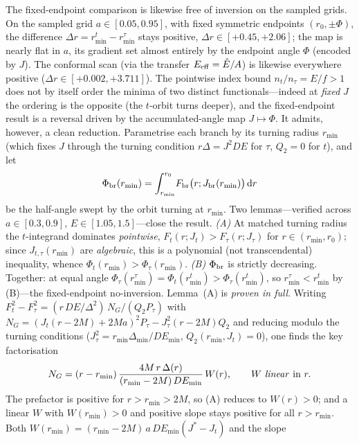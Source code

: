 \documentclass[12pt]{iopart}
\theoremstyle{plain}
\theoremstyle{definition}
\theoremstyle{remark}
\newcommand{\dd}{\mathrm{d}}
\begin{document}
The fixed-endpoint comparison is likewise free of inversion on the sampled grids. On the sampled grid $a\in[0.05,0.95]$, with fixed symmetric
endpoints $(r_0,\pm\Phi)$, the difference $\Delta r=r_{\min}^t-r_{\min}^\tau$ stays positive,
$\Delta r\in[+0.45,+2.06]$; the map is nearly flat
in $a$, its gradient set almost entirely by the endpoint angle
$\Phi$ (encoded by $J$). The conformal scan (via the transfer
$E_{\rm eff}=\hat E/A$) is likewise everywhere positive
($\Delta r\in[+0.002,+3.711]$). The pointwise index bound $n_t/n_\tau=E/f>1$ does
not by itself order the minima of two distinct functionals---indeed at \emph{fixed}
$J$ the ordering is the opposite (the $t$-orbit turns deeper), and the fixed-endpoint
result is a reversal driven by the accumulated-angle map $J\mapsto\Phi$. It admits,
however, a clean reduction. Parametrise each branch by its turning radius $r_{\min}$
(which fixes $J$ through the turning condition $r\Delta=J^2 DE$ for $\tau$, $Q_2=0$
for $t$), and let
\begin{equation}
    \Phi_{\rm br}(r_{\min})=\int_{r_{\min}}^{r_0}\!F_{\rm br}\big(r;J_{\rm br}(r_{\min})\big)\,\dd r
\end{equation}
be the half-angle swept by the orbit turning at $r_{\min}$. Two lemmas---verified
across $a\in[0.3,0.9]$, $E\in[1.05,1.5]$---close the result. \emph{(A)} At matched
turning radius the $t$-integrand dominates \emph{pointwise},
$F_t(r;J_t)>F_\tau(r;J_\tau)$ for $r\in(r_{\min},r_0)$; since $J_{t,\tau}(r_{\min})$
are \emph{algebraic}, this is a polynomial (not transcendental) inequality, whence
$\Phi_t(r_{\min})>\Phi_\tau(r_{\min})$. \emph{(B)} $\Phi_{\rm br}$ is strictly
decreasing. Together: at equal angle
$\Phi_\tau(r_{\min}^\tau)=\Phi_t(r_{\min}^t)>\Phi_\tau(r_{\min}^t)$, so
$r_{\min}^\tau<r_{\min}^t$ by (B)---the fixed-endpoint no-inversion. Lemma~(A) is
\emph{proven in full}. Writing $F_t^2-F_\tau^2=(r\,DE/\Delta^2)\,N_G/(Q_2 P_\tau)$
with $N_G=(J_t(r-2M)+2Ma)^2 P_\tau-J_\tau^2(r-2M)Q_2$ and reducing modulo the turning
conditions ($J_\tau^2=r_{\min}\Delta_{\min}/DE_{\min}$, $Q_2(r_{\min},J_t)=0$), one
finds the key factorisation
\begin{equation}
    N_G=(r-r_{\min})\,\frac{4M\,r\,\Delta(r)}{(r_{\min}-2M)\,DE_{\min}}\,W(r),\qquad W\ \text{\emph{linear} in }r .
\end{equation}
The prefactor is positive for $r>r_{\min}>2M$, so (A) reduces to $W(r)>0$; and a
linear $W$ with $W(r_{\min})>0$ and positive slope stays positive for all
$r>r_{\min}$. Both $W(r_{\min})=(r_{\min}-2M)\,a\,DE_{\min}(J^\ast-J_t)$ and the slope
\end{document}
